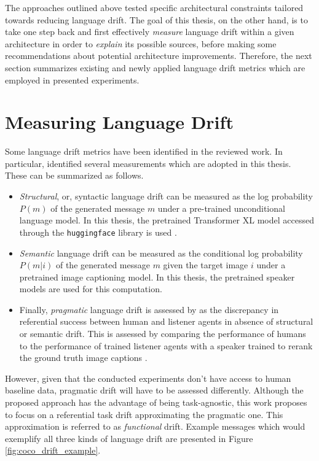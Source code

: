 The approaches outlined above tested specific architectural constraints tailored towards reducing language drift. The goal of this thesis, on the other hand, is to take one step back and first effectively \textit{measure} language drift within a given architecture in order to \textit{explain} its possible sources, before making some recommendations about potential architecture improvements. Therefore, the next section summarizes existing and newly applied language drift metrics which are employed in presented experiments. 

\section{Measuring Language Drift}
\label{ld_metrics}

Some language drift metrics have been identified in the reviewed work. In particular, \cite{lazaridou2020multi} identified several measurements which are adopted in this thesis. These can be summarized as follows. 
\begin{itemize}
	\item \textit{Structural}, or, syntactic language drift can be measured as the log probability $P(m)$ of the generated message $m$ under a pre-trained unconditional language model. In this thesis, the pretrained Transformer XL model accessed through the \texttt{huggingface} library is used \parencite{dai2019transformer, wolf2019huggingface}.
	\item \textit{Semantic} language drift can be measured as the conditional log probability $P(m|i)$ of the generated message $m$ given the target image $i$ under a pretrained image captioning model. In this thesis, the pretrained speaker models are used for this computation. %
	\item Finally, \textit{pragmatic} language drift is assessed by \cite{lazaridou2020multi} as the discrepancy in referential success between human and listener agents in absence of structural or semantic drift. This is assessed by comparing the performance of humans to the performance of trained listener agents with a speaker trained to rerank the ground truth image captions \parencite{lazaridou2020multi}. 
\end{itemize}
However, given that the conducted experiments don't have access to human baseline data, pragmatic drift will have to be assessed differently. Although the proposed approach has the advantage of being task-agnostic, this work proposes to focus on a referential task drift approximating the pragmatic one. This approximation is referred to as \textit{functional} drift. Example messages which would exemplify all three kinds of language drift are presented in Figure \ref{fig:coco_drift_example}.

